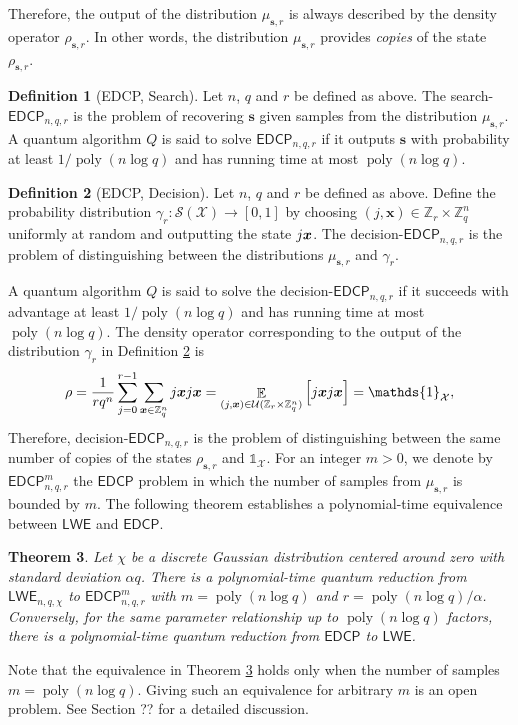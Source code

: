 \documentclass[11pt]{article}
\theoremstyle{plain}
\newtheorem{theorem}{Theorem}
\theoremstyle{definition}
\newtheorem{definition}[theorem]{Definition}
\DeclareMathOperator{\poly}{poly}
\DeclareMathOperator{\E}{\mathbb{E}}
\let\ket\relax
\DeclarePairedDelimiter{\ket}{\lvert}{\rangle}
\let\bra\relax
\DeclarePairedDelimiter{\bra}{\langle}{\rvert}
\def\Z{\mathbb{Z}}
\def\lwe{\mathsf{LWE}}
\def\edcp{\mathsf{EDCP}}
\def\X{\mathcal{X}}
\def\SX{\mathcal{S(X)}}
\def\U{\mathcal{U}}
\begin{document}
Therefore, the output of the distribution $\mu_{\bm{s}, r}$ is always described by the density operator $\rho_{\bm{s}, r}$. In other words, the distribution $\mu_{\bm{s}, r}$ provides \textit{copies} of the state $\rho_{\bm{s}, r}$.
\begin{definition}[EDCP, Search]
    Let $n$, $q$ and $r$ be defined as above. The search-$\edcp_{n, q, r}$ is the problem of recovering $\bm{s}$ given samples from the distribution $\mu_{\bm{s}, r}$. A quantum algorithm $Q$ is said to solve $\edcp_{n, q, r}$ if it outputs $\bm{s}$ with probability at least $1 / \poly(n\log q)$ and has running time at most $\poly(n\log q)$.
\end{definition}
\begin{definition}[EDCP, Decision]
    \label{def:d-edcp}
    Let $n$, $q$ and $r$ be defined as above. Define the probability distribution $\gamma_r: \SX \rightarrow [0, 1]$ by choosing $(j, \bm{x}) \in \Z_r \times \Z_q^n$ uniformly at random and outputting the state $\ket{j}\ket{\bm{x}}$. The decision-$\edcp_{n, q, r}$ is the problem of distinguishing between the distributions $\mu_{\bm{s}, r}$ and $\gamma_r$.
\end{definition}
A quantum algorithm $Q$ is said to solve the decision-$\edcp_{n, q, r}$ if it succeeds with advantage at least $1 / \poly(n\log q)$ and has running time at most $\poly(n\log q)$. The density operator corresponding to the output of the distribution $\gamma_r$ in Definition \ref{def:d-edcp} is
\[ \rho = \frac{1}{rq^n} \sum_{j = 0}^{r - 1} \sum_{\bm{x} \in \Z_q^n}  \ket{j}\ket{\bm{x}} \bra{j}\bra{\bm{x}} = \E_{(j, \bm{x}) \in \U(\Z_r \times \Z_q^n)} \Big[ \ket{j}\ket{\bm{x}} \bra{j}\bra{\bm{x}} \Big] = \mathds{1}_{\X}, \]
Therefore, decision-$\edcp_{n, q, r}$ is the problem of distinguishing between the same number of copies of the states $\rho_{\bm{s}, r}$ and $\mathds{1}_{\X}$. For an integer $m > 0$, we denote by $\edcp_{n, q, r}^m$ the $\edcp$ problem in which the number of samples from $\mu_{\bm{s}, r}$ is bounded by $m$. The following theorem establishes a polynomial-time equivalence between $\lwe$ and $\edcp$.
\begin{theorem}
    \label{thm:lwe-edcp}
    Let $\chi$ be a discrete Gaussian distribution centered around zero with standard deviation $\alpha q$. There is a polynomial-time quantum reduction from $\lwe_{n, q, \chi}$ to $\edcp_{n, q, r}^m$ with $m = \poly(n\log q)$ and $r = \poly(n\log q) / \alpha$. Conversely, for the same parameter relationship up to $\poly(n\log q)$ factors, there is a polynomial-time quantum reduction from $\edcp$ to $\lwe$. 
\end{theorem}
Note that the equivalence in Theorem \ref{thm:lwe-edcp} holds only when the number of samples $m = \poly(n\log q)$. Giving such an equivalence for arbitrary $m$ is an open problem. See Section ?? for a detailed discussion.
\end{document}
